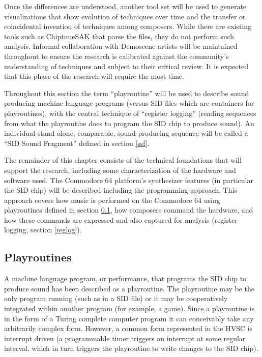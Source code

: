 \documentclass[10pt]{article}
\begin{document}
\begin{multicols*}{2}
Once the differences are understood, another tool set will be used to generate visualizations that show evolution of techniques over time and the transfer or coincidental invention of techniques among composers. While there are existing tools such as ChiptuneSAK\cite{ChiptuneSAK} that parse the files, they do not perform such analysis. Informal collaboration with Demoscene artists will be maintained throughout to ensure the research is calibrated against the community’s understanding of techniques and subject to their critical review. It is expected that this phase of the research will require the most time.

Throughout this section the term “playroutine” will be used to describe sound producing machine language programs (versus SID files which are containers for playroutines), with the central technique of “register logging” (reading sequences from what the playroutine does to program the SID chip to produce sound). An individual stand alone, comparable, sound producing sequence will be called a “SID Sound Fragment” defined in section \ref{ssf}.

The remainder of this chapter consists of the technical foundations that will support the research, including some characterization of the hardware and software used. The Commodore 64 platform’s synthesizer features (in particular the SID chip) will be described including the programming approach. This approach covers how music is performed on the Commodore 64 using playroutines defined in section \ref{playroutines}, how composers command the hardware, and how these commands are expressed and also captured for analysis (register logging, section \ref{reglog}).

\subsection{Playroutines}
\label{playroutines}

A machine language program, or performance, that programs the SID chip to produce sound has been described as a playroutine. The playroutine may be the only program running (such as in a SID file) or it may be cooperatively integrated within another program (for example, a game). Since a playroutine is in the form of a Turing complete computer program it can conceivably take any arbitrarily complex form. However, a common form represented in the HVSC is interrupt driven (a programmable timer triggers an interrupt at some regular interval, which in turn triggers the playroutine to write changes to the SID chip).


\end{multicols*}
\end{document}
